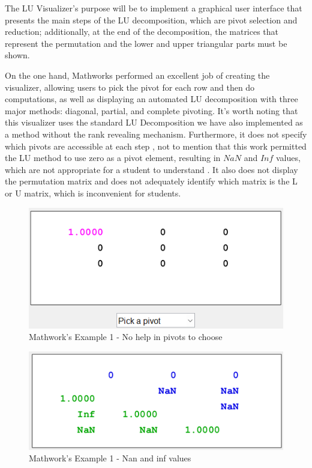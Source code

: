 The LU Visualizer's purpose will be to implement a graphical user interface that presents the main steps of the LU decomposition, which are pivot selection and reduction; additionally, at the end of the decomposition, the matrices that represent the permutation and the lower and upper triangular parts must be shown. 

On the one hand, Mathworks performed an excellent job of creating the visualizer, allowing users to pick the pivot for each row and then do computations, as well as displaying an automated LU decomposition with three major methods: diagonal, partial, and complete pivoting. It's worth noting that this visualizer uses the standard LU Decomposition we have also implemented as a method without the rank revealing mechanism. Furthermore, it does not specify which pivots are accessible at each step , not to mention that this work permitted the LU method to use zero as a pivot element, resulting in $NaN$ and $Inf$ values, which are not appropriate for a student to understand . It also does not display the permutation matrix and does not adequately identify which matrix is the L or U matrix, which is inconvenient for students.

 
\begin{figure}[H]
    \centering
    \includegraphics[scale=0.7]{Include/Images/Thesis/Development/Visualizers/LU VISUALIZER/Mathworks.LU.Ex1.png}
    \caption{Mathwork's \cite{doi:10.1137/1.9780898717952} Example 1 - No help in pivots to choose}
    \label{fig:Mathworks Example 1 - No help in pivots to choose}
\end{figure}

\begin{figure}[H]
    \centering
    \includegraphics[scale=0.7]{Include/Images/Thesis/Development/Visualizers/LU VISUALIZER/Mathworks.LU.Ex1.1.png}
    \caption{Mathwork's \cite{doi:10.1137/1.9780898717952} Example 1 - Nan and inf values}
    \label{fig:Mathworks Example 1 - Nan and inf values}
\end{figure}


